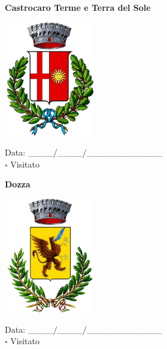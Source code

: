\documentclass[a5paper,12pt]{article}
\begin{document}
\vspace{0.7cm}

\noindent
\begin{minipage}[t]{0.45\textwidth}
    \begin{center}
        \textbf{Castrocaro Terme e Terra del Sole}
    \end{center}
    \vspace{-0.5cm} %
    \begin{center}
        \includegraphics[height= 5cm, width=4cm]{Emilia Romagna/Stemma Castrocaro Terme e Terra del Sole.png}
    \end{center}
    \vspace{-0.4cm} %
    \begin{flushleft}
        Data: \_\_\_\_/\_\_\_\_/\_\_\_\_\_\_\_\_\_\_\_\_ \\
        $\square$ Visitato
    \end{flushleft}
\end{minipage}
\hfill
\noindent
\begin{minipage}[t]{0.45\textwidth}
    \begin{center}
        \textbf{Dozza}
    \end{center}
    \vspace{-0.1cm} %
    \begin{center}
        \includegraphics[height= 5cm, width=4cm]{Emilia Romagna/Stemma Dozza.png}
    \end{center}
    \vspace{-0.27cm} %
    \begin{flushleft}
        Data: \_\_\_\_/\_\_\_\_/\_\_\_\_\_\_\_\_\_\_\_\_ \\
        $\square$ Visitato
    \end{flushleft}
\end{minipage}
\end{document}
